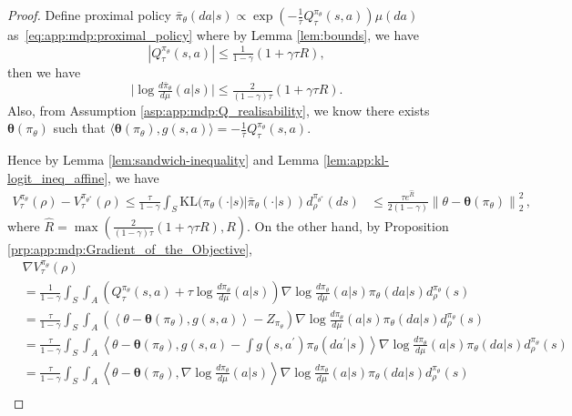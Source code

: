 \documentclass{amsart}
\theoremstyle{definition}
\begin{document}
\begin{proof}
Define proximal policy $\bar{\pi}_\theta(da|s) \propto \exp\left(-\frac{1}{\tau}Q^{\pi_\theta}_\tau(s,a) \right)\mu(da)$ as~\eqref{eq:app:mdp:proximal_policy} where by Lemma \ref{lem:bounds}, we have
\[
|Q^{\pi_{\theta}}_{\tau}(s,a)| \le \tfrac{1}{1-\gamma} \left(1+\gamma\tau R\right),
\]
then we have
\[
\big|\log \tfrac{d\bar{\pi}_{{\theta}}}{d\mu}(a|s)\big| \leq \tfrac{2}{(1-\gamma)\tau} \left(1+\gamma\tau R\right).
\]
Also, from Assumption \ref{asp:app:mdp:Q_realisability}, we know there exists $\boldsymbol{\theta}(\pi_\theta)$ such that $\langle \boldsymbol{\theta}(\pi_\theta), g(s,a)\rangle = -\frac{1}{\tau} Q^{\pi_\theta}_\tau(s,a)$. 

Hence by Lemma \ref{lem:sandwich-inequality} and Lemma \ref{lem:app:kl-logit_ineq_affine}, we have
\begin{align}
\label{eq:sandwich_ineq}
V_\tau^{\pi_\theta}(\rho) - V_\tau^{\pi_{\theta^*}}(\rho) 
\leq \frac{\tau}{1-\gamma}\int_S \mathrm{KL}(\pi_\theta (\cdot |s) | \bar{\pi}_{\theta}(\cdot |s))d_\rho^{\pi_{\theta^*}}(ds) 
& \leq \frac{\tau e^{\hat{R}} }{2(1-\gamma) }\left\|\theta - \boldsymbol{\theta}(\pi_\theta) \right\|_2^2\, , 
\end{align}
where $\hat{R} = \max\left(\frac{2}{(1-\gamma)\tau} \left(1+\gamma\tau R\right), R\right)$.
On the other hand, by Proposition \ref{prp:app:mdp:Gradient_of_the_Objective},
\begin{align}
& \nabla V_\tau^{\pi_\theta}(\rho) \nonumber \\
& = \frac{1}{1-\gamma}\int_S\int_A \left(Q^{\pi_\theta}_\tau(s,a) + \tau \log \frac{d \pi_{\theta}}{d \mu}(a|s)\right)\nabla \log \frac{d\pi_\theta}{d \mu}(a| s)\pi_{\theta}(da|s)d_{\rho}^{\pi_{\theta}}(s) \nonumber \\
& = \frac{\tau}{1-\gamma}\int_S\int_A \left(\left \langle \theta - \boldsymbol{\theta}(\pi_\theta),g(s,a)\right  \rangle - Z_{\pi_\theta}\right)\nabla \log \frac{d\pi_\theta}{d \mu}(a| s)\pi_{\theta}(da|s)d_{\rho}^{\pi_{\theta}}(s) \nonumber \\
& = \frac{\tau}{1-\gamma}\int_S\int_A \left \langle \theta - \boldsymbol{\theta}(\pi_\theta),g(s,a)- \int g(s,a^\prime) \pi_\theta(da^\prime |s)\right  \rangle  \nabla \log \frac{d\pi_\theta}{d \mu}(a| s)\pi_{\theta}(da|s)d_{\rho}^{\pi_{\theta}}(s) \nonumber \\
& = \frac{\tau}{1-\gamma}\int_S\int_A \left \langle \theta - \boldsymbol{\theta}(\pi_\theta),\nabla \log \frac{d\pi_\theta}{d \mu}(a| s)\right  \rangle \nabla \log \frac{d\pi_\theta}{d \mu}(a| s)\pi_{\theta}(da|s)d_{\rho}^{\pi_{\theta}}(s) \nonumber \\

\end{align}
\end{proof}
\end{document}
